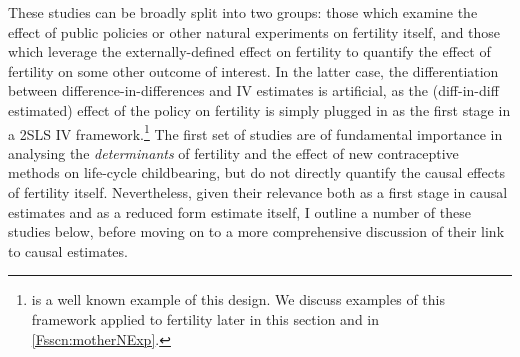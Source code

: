 These studies can be broadly split into two groups: those which examine the
effect of public policies or other natural experiments on fertility itself,
and those which leverage the externally-defined effect on fertility to quantify
the effect of fertility on some other outcome of interest. In the latter case, 
the differentiation between difference-in-differences and IV estimates is 
artificial, as the (diff-in-diff estimated) effect of the policy on fertility is 
simply plugged in as the first stage in a 2SLS IV framework.\footnote{
\citet{Duflo2001} is a well known example of this design.  We discuss examples 
of this framework applied to fertility later in this section and in 
\ref{Fsscn:motherNExp}.} The first set of studies are of fundamental importance 
in analysing the \emph{determinants} of fertility and the effect of new 
contraceptive methods on life-cycle childbearing, but do not directly quantify 
the causal effects of fertility itself.  Nevertheless, given their relevance both 
as a first stage in causal estimates and as a reduced form estimate itself, I 
outline a number of these studies below, before moving on to a more comprehensive 
discussion of their link to causal estimates.

